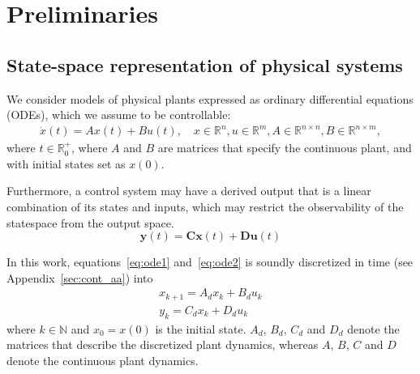 \documentclass[sigconf]{llncs}
\newcommand{\mat}[1]{\boldsymbol{#1}}
\renewcommand{\vec}[1]{\boldsymbol{#1}}
\begin{document}
\section{Preliminaries}
\label{sec:preliminaries}

\subsection{State-space representation of physical systems}
\label{sec:ssrepresentation}


We consider models of physical plants expressed as ordinary differential
equations (ODEs), which we assume to be controllable:
%
\begin{align}
\label{eq:ode1}
\dot{x}(t) = Ax(t)+ B u(t), \quad x \in \mathbb{R}^{n}, u \in \mathbb{R}^m, A \in \mathbb{R}^{n \times n}, B \in \mathbb{R}^{n \times m}, 
\end{align}
%
where $t \in \mathbb R_0^+$, where $A$ and $B$ are matrices that 
specify the continuous plant, and with initial states set as $x(0)$.

Furthermore, a control system may have a derived
output that is a linear combination of its states and inputs, which may
restrict the observability of the statespace from the output space.
\begin{equation}
\label{eq:ode2}  
\vec{y}(t)=\mat{C}\vec{x}(t)+\mat{D}\vec{u}(t)
\end{equation}

In this work, equations~\eqref{eq:ode1} and~\eqref{eq:ode2} is soundly discretized in time (see Appendix~\ref{sec:cont_aa})  into
\begin{align}
\label{eq:plant}
x_{k+1} = A_d x_k+ B_d u_k\\
y_{k} = C_d x_k + D_d u_k
\end{align} 
%
where $k \in \mathbb N$ and $x_{0}=x(0)$ is the initial state. 
$A_d$, $B_d$, $C_d$ and $D_d$ denote the matrices that describe the discretized plant dynamics, whereas $A$, $B$, $C$ and $D$ denote the continuous plant dynamics.  
\end{document}
